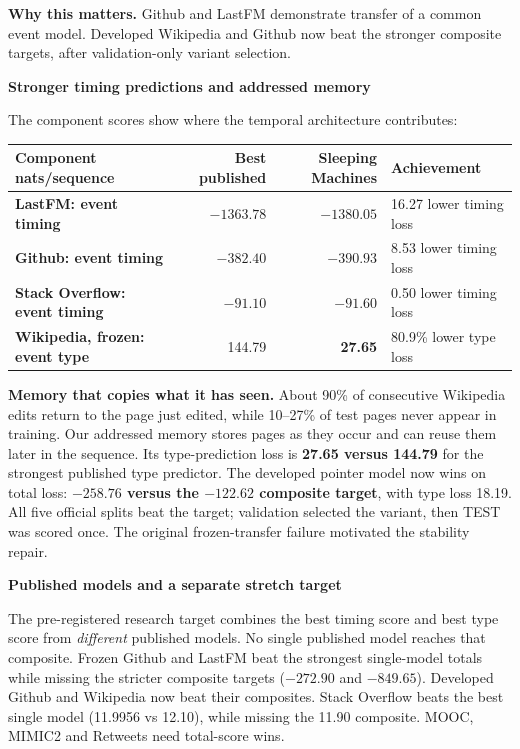 \documentclass[10pt, a4 paper]{article}
\newcommand{\down}{\,{\color{good}\faArrowDown}}
\begin{document}
\vspace{4mm}
\begin{tile}
\textbf{Why this matters.} Github and LastFM demonstrate transfer of a common event model. Developed Wikipedia and Github now beat the stronger composite targets, after validation-only variant selection.
\end{tile}

\vspace{3mm}
{\large\bfseries Stronger timing predictions and addressed memory}\par
The component scores show where the temporal architecture contributes:

{\small
\begin{tabularx}{\linewidth}{>{\bfseries}Y r r Y}
\toprule
Component {\color{muted}\footnotesize nats/sequence \down} & Best published & Sleeping Machines & Achievement \\
\midrule
LastFM: event timing & $-1363.78$ & \textbf{$-1380.05$} & 16.27 lower timing loss \\
Github: event timing & $-382.40$ & \textbf{$-390.93$} & 8.53 lower timing loss \\
Stack Overflow: event timing & $-91.10$ & \textbf{$-91.60$} & 0.50 lower timing loss \\
Wikipedia, frozen: event type & 144.79 & \textbf{27.65} & 80.9\% lower type loss \\
\bottomrule
\end{tabularx}}

\begin{tile}
\textbf{Memory that copies what it has seen.} About 90\% of consecutive Wikipedia edits return to the page just edited, while 10--27\% of test pages never appear in training. Our addressed memory stores pages as they occur and can reuse them later in the sequence. Its type-prediction loss is \textbf{27.65 versus 144.79} for the strongest published type predictor. The developed pointer model now wins on total loss: \textbf{$-258.76$ versus the $-122.62$ composite target}, with type loss 18.19. All five official splits beat the target; validation selected the variant, then TEST was scored once. The original frozen-transfer failure motivated the stability repair.
\end{tile}

\vspace{2mm}
{\small\bfseries Published models and a separate stretch target}\par
{\small The pre-registered research target combines the best timing score and best type score from \emph{different} published models. No single published model reaches that composite. Frozen Github and LastFM beat the strongest single-model totals while missing the stricter composite targets ($-272.90$ and $-849.65$). Developed Github and Wikipedia now beat their composites. Stack Overflow beats the best single model (11.9956 vs 12.10), while missing the 11.90 composite. MOOC, MIMIC2 and Retweets need total-score wins.}
\end{document}
